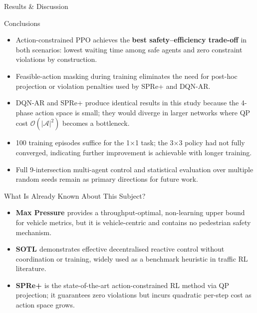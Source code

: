 \documentclass[final,20pt]{beamer}
\newlength{\colwidth}
\begin{document}
\begin{frame}[t]
\begin{columns}[t]
\begin{column}{\colwidth}
\begin{block}{Results \& Discussion}
  \end{block}

  \begin{block}{Conclusions}
    \begin{itemize}
      \item Action-constrained PPO achieves the \textbf{best safety--efficiency
        trade-off} in both scenarios: lowest waiting time among safe agents and
        zero constraint violations by construction.
      \item Feasible-action masking during training eliminates the need for
        post-hoc projection or violation penalties used by SPRe+ and DQN-AR.
      \item DQN-AR and SPRe+ produce identical results in this study because
        the 4-phase action space is small; they would diverge in larger
        networks where QP cost $\mathcal{O}(|\mathcal{A}|^2)$ becomes a
        bottleneck.
      \item 100 training episodes suffice for the 1$\times$1 task; the 3$\times$3
        policy had not fully converged, indicating further improvement is
        achievable with longer training.
      \item Full 9-intersection multi-agent control and statistical evaluation
        over multiple random seeds remain as primary directions for future work.
    \end{itemize}
  \end{block}

  \begin{exampleblock}{What Is Already Known About This Subject?}
    \begin{itemize}
      \item \textbf{Max Pressure \cite{varaiya2013}} provides a
        throughput-optimal, non-learning upper bound for vehicle metrics,
        but it is vehicle-centric and contains no pedestrian safety mechanism.
      \item \textbf{SOTL \cite{gershenson2005}} demonstrates effective
        decentralised reactive control without coordination or training, widely
        used as a benchmark heuristic in traffic RL literature.
      \item \textbf{SPRe+ \cite{hung2025}} is the state-of-the-art
        action-constrained RL method via QP projection; it guarantees zero
        violations but incurs quadratic per-step cost as action space grows.
    \end{itemize}
  \end{exampleblock}


\end{column}
\end{columns}
\end{frame}
\end{document}
